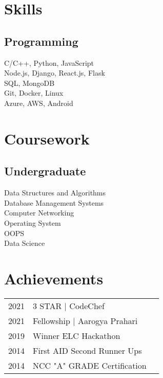 \documentclass[]{deedy-resume-openfont}
\begin{document}
\begin{minipage}[t]{0.34\textwidth}

\section{Skills}
\subsection{Programming}
\vspace{\topsep} %
C/C++, Python, JavaScript \\
Node.js, Django, React.js, Flask \\
SQL, MongoDB \\
Git, Docker, Linux \\
Azure, AWS, Android 
\sectionsep



\section{Coursework}
\subsection{Undergraduate}
\vspace{\topsep} %
Data Structures and Algorithms \\
Database Management Systems \\
Computer Networking \\
Operating System \\
OOPS \\
Data Science \\
\sectionsep


\section{Achievements}
\begin{tabular}{rll}
2021 & 3 STAR | CodeChef \\
2021 & Fellowship | Aarogya Prahari \\
2019 & Winner ELC Hackathon \\
2014 & First AID Second Runner Ups \\
2014 & NCC "A" GRADE Certification\\
\end{tabular}
\sectionsep


\end{minipage}
\end{document}
